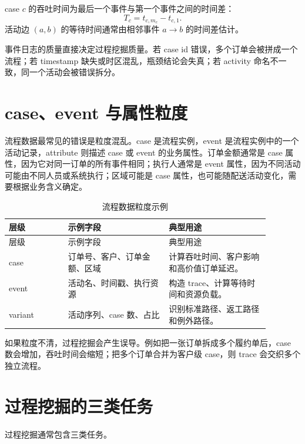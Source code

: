 \documentclass[UTF8,fontset=fandol,openany,zihao=-4]{ctexbook}
\begin{document}
\begin{definition}[吞吐时间]
case \(c\) 的吞吐时间为最后一个事件与第一个事件之间的时间差：
\[
  T_c=t_{c,m_c}-t_{c,1}.
\]
活动边 \((a,b)\) 的等待时间通常由相邻事件 \(a\rightarrow b\) 的时间差估计。
\end{definition}

事件日志的质量直接决定过程挖掘质量。若 case id 错误，多个订单会被拼成一个流程；若 timestamp 缺失或时区混乱，瓶颈结论会失真；若 activity 命名不一致，同一个活动会被错误拆分。

\section{case、event 与属性粒度}

流程数据最常见的错误是粒度混乱。case 是流程实例，event 是流程实例中的一个活动记录，attribute 则描述 case 或 event 的业务属性。订单金额通常是 case 属性，因为它对同一订单的所有事件相同；执行人通常是 event 属性，因为不同活动可能由不同人员或系统执行；区域可能是 case 属性，也可能随配送活动变化，需要根据业务含义确定。

\begin{longtable}{>{\raggedright\arraybackslash}p{0.20\linewidth}>{\raggedright\arraybackslash}p{0.34\linewidth}>{\raggedright\arraybackslash}p{0.34\linewidth}}
\caption{流程数据粒度示例}\\
\toprule
层级 & 示例字段 & 典型用途\\
\midrule
\endfirsthead
\toprule
层级 & 示例字段 & 典型用途\\
\midrule
\endhead
case & 订单号、客户、订单金额、区域 & 计算吞吐时间、客户影响和高价值订单延迟。\\
event & 活动名、时间戳、执行资源 & 构造 trace、计算等待时间和资源负载。\\
variant & 活动序列、case 数、占比 & 识别标准路径、返工路径和例外路径。\\
\bottomrule
\end{longtable}

如果粒度不清，过程挖掘会产生误导。例如把一张订单拆成多个履约单后，case 数会增加，吞吐时间会缩短；把多个订单合并为客户级 case，则 trace 会交织多个独立流程。

\section{过程挖掘的三类任务}

过程挖掘通常包含三类任务。
\end{document}
